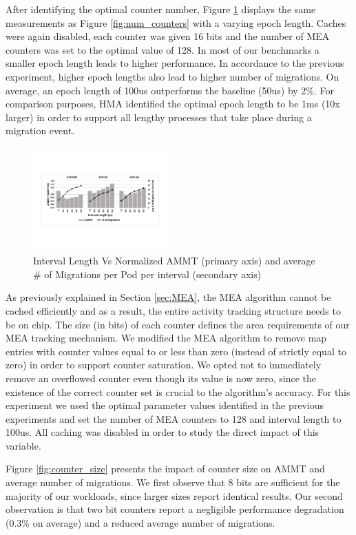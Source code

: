 After identifying the optimal counter number, Figure \ref{fig:interval} displays the same measurements as Figure \ref{fig:num_counters} with a varying epoch length. Caches were again disabled, each counter was given 16 bits and the number of MEA counters was set to the optimal value of 128. In most of our benchmarks a smaller epoch length leads to higher performance. In accordance to the previous experiment, higher epoch lengths also lead to higher number of migrations. On average, an epoch length of 100us outperforms the baseline (50us) by 2\%. For comparison purposes, HMA \cite{meswani-HPCA21} identified the optimal epoch length to be 1ms (10x larger) in order to support all lengthy processes that take place during a migration event.

\begin{figure}[h]
  \includegraphics[width=0.46\textwidth]{figures/interval_length_normalized.pdf}
  \caption{Interval Length Vs Normalized AMMT (primary axis) and average \# of Migrations per Pod per interval (secondary axis)}
  \label{fig:interval}
\end{figure}

As previously explained in Section \ref{sec:MEA}, the MEA algorithm cannot be cached efficiently and as a result, the entire activity tracking structure needs to be on chip. The size (in bits) of each counter defines the area requirements of our MEA tracking mechanism. We modified the MEA algorithm to remove map entries with counter values equal to or less than zero (instead of strictly equal to zero) in order to support counter saturation. We opted not to immediately remove an overflowed counter even though its value is now zero, since the existence of the correct counter set is crucial to the algorithm's accuracy. For this experiment we used the optimal parameter values identified in the previous experiments and set the number of MEA counters to 128 and interval length to 100us. All caching was disabled in order to study the direct impact of this variable.

Figure \ref{fig:counter_size} presents the impact of counter size on AMMT and average number of migrations. We first observe that 8 bits are sufficient for the majority of our workloads, since larger sizes report identical results. Our second observation is that two bit counters report a negligible performance degradation (0.3\% on average) and a reduced average number of migrations.

